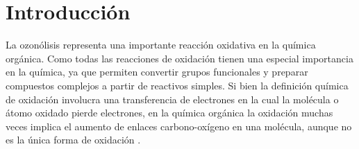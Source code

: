 \documentclass[fleqn,10pt]{SelfArx}
\begin{document}
\flushbottom %

\maketitle %


\thispagestyle{empty} %
\renewcommand{\tablename}{Tabla} 



\section*{Introducci\'on} %
La ozon\'olisis representa una importante reacci\'on oxidativa en la qu\'imica org\'anica. Como todas las reacciones de oxidaci\'on tienen una especial importancia en la qu\'imica, ya que permiten convertir grupos funcionales y preparar compuestos complejos a partir de reactivos simples. Si bien la definici\'on qu\'imica de oxidaci\'on involucra una transferencia de electrones en la cual la mol\'ecula o \'atomo oxidado pierde electrones, en la qu\'imica org\'anica la oxidaci\'on muchas veces implica el aumento de enlaces carbono-ox\'igeno en una mol\'ecula, aunque no es la \'unica forma de oxidaci\'on \cite{Gilbert2010}.
\end{document}
